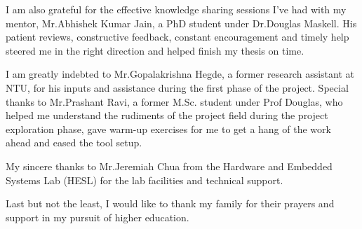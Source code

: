I am also grateful for the effective knowledge sharing sessions I’ve had with my mentor, Mr.Abhishek Kumar Jain, a PhD student under Dr.Douglas Maskell. His patient reviews, constructive feedback, constant encouragement and timely help steered me in the right direction and helped finish my thesis on time.\newline 

I am greatly indebted to Mr.Gopalakrishna Hegde, a former research assistant at NTU, for his inputs and assistance during the first phase of the project. Special thanks to Mr.Prashant Ravi, a former M.Sc. student under Prof Douglas, who helped me understand the rudiments of the project field during the project exploration phase, gave warm-up exercises for me to get a hang of the work ahead and eased the tool setup.\newline 

My sincere thanks to Mr.Jeremiah Chua from the Hardware and Embedded Systems Lab (HESL) for the lab facilities and technical support.\newline 

Last but not the least, I would like to thank my family for their prayers and support in my pursuit of higher education. 